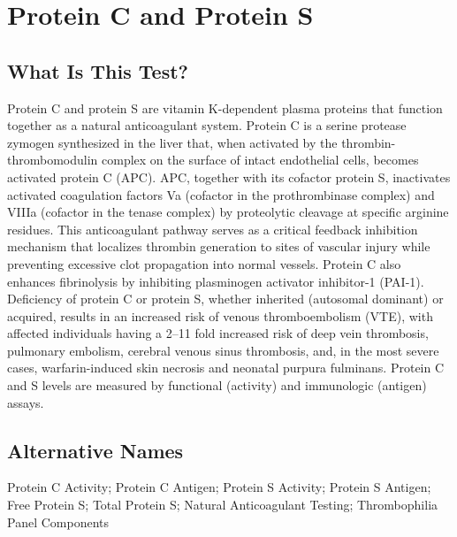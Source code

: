 \chapter{Protein C and Protein S}

\section*{What Is This Test?}
Protein C and protein S are vitamin K-dependent plasma proteins that function together as a natural anticoagulant system. Protein C is a serine protease zymogen synthesized in the liver that, when activated by the thrombin-thrombomodulin complex on the surface of intact endothelial cells, becomes activated protein C (APC). APC, together with its cofactor protein S, inactivates activated coagulation factors Va (cofactor in the prothrombinase complex) and VIIIa (cofactor in the tenase complex) by proteolytic cleavage at specific arginine residues. This anticoagulant pathway serves as a critical feedback inhibition mechanism that localizes thrombin generation to sites of vascular injury while preventing excessive clot propagation into normal vessels. Protein C also enhances fibrinolysis by inhibiting plasminogen activator inhibitor-1 (PAI-1). Deficiency of protein C or protein S, whether inherited (autosomal dominant) or acquired, results in an increased risk of venous thromboembolism (VTE), with affected individuals having a 2--11 fold increased risk of deep vein thrombosis, pulmonary embolism, cerebral venous sinus thrombosis, and, in the most severe cases, warfarin-induced skin necrosis and neonatal purpura fulminans. Protein C and S levels are measured by functional (activity) and immunologic (antigen) assays.

\section*{Alternative Names}
Protein C Activity; Protein C Antigen; Protein S Activity; Protein S Antigen; Free Protein S; Total Protein S; Natural Anticoagulant Testing; Thrombophilia Panel Components

